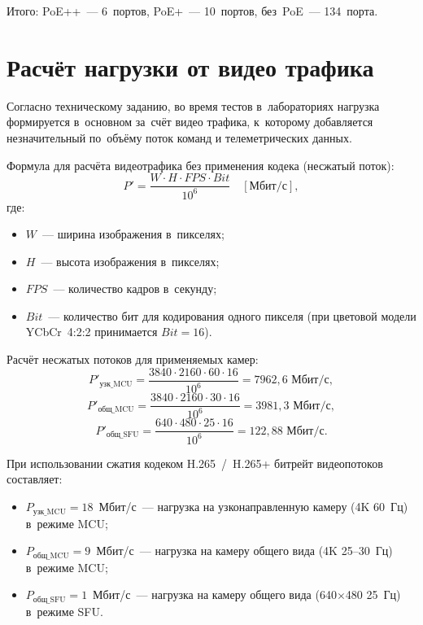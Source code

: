 \documentclass[a4paper,oneside,14pt]{extreport}
\begin{document}
Итого: PoE++~--- 6~портов, PoE+~--- 10~портов, без~PoE~--- 134~порта.

\section{Расчёт нагрузки от видео трафика}

Согласно техническому заданию, во время тестов в~лабораториях нагрузка формируется в~основном за~счёт видео трафика, к~которому добавляется незначительный по~объёму поток команд и телеметрических данных.

Формула для расчёта видеотрафика без применения кодека (несжатый поток):
\begin{equation}
    P' = \frac{W \cdot H \cdot FPS \cdot Bit}{10^{6}} \quad [\text{Мбит/с}],
    \label{eq:bitrate_raw}
\end{equation}
где:
\begin{itemize}
    \item $W$~--- ширина изображения в~пикселях;
    \item $H$~--- высота изображения в~пикселях;
    \item $FPS$~--- количество кадров в~секунду;
    \item $Bit$~--- количество бит для кодирования одного пикселя (при цветовой модели YCbCr~4:2:2 принимается $Bit = 16$).
\end{itemize}

Расчёт несжатых потоков для применяемых камер:
\begin{equation}
    P'_{\text{узк\_MCU}} = \frac{3840 \cdot 2160 \cdot 60 \cdot 16}{10^{6}} = 7962{,}6 \text{ Мбит/с},
    \label{eq:raw_narrow}
\end{equation}
\begin{equation}
    P'_{\text{общ\_MCU}} = \frac{3840 \cdot 2160 \cdot 30 \cdot 16}{10^{6}} = 3981{,}3 \text{ Мбит/с},
    \label{eq:raw_overview_mcu}
\end{equation}
\begin{equation}
    P'_{\text{общ\_SFU}} = \frac{640 \cdot 480 \cdot 25 \cdot 16}{10^{6}} = 122{,}88 \text{ Мбит/с}.
    \label{eq:raw_overview_sfu}
\end{equation}

При использовании сжатия кодеком H.265~/~H.265+ битрейт видеопотоков составляет:
\begin{itemize}
    \item $P_{\text{узк\_MCU}} = 18$~Мбит/с~--- нагрузка на узконаправленную камеру (4K 60~Гц) в~режиме MCU;
    \item $P_{\text{общ\_MCU}} = 9$~Мбит/с~--- нагрузка на камеру общего вида (4K 25--30~Гц) в~режиме MCU;
    \item $P_{\text{общ\_SFU}} = 1$~Мбит/с~--- нагрузка на камеру общего вида (640$\times$480 25~Гц) в~режиме SFU.
\end{itemize}
\end{document}
